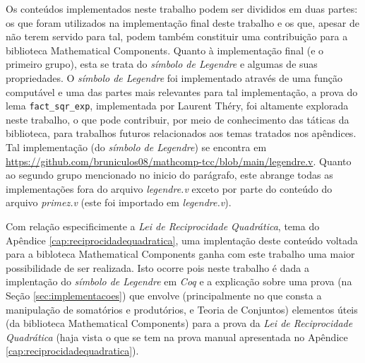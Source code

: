 Os conteúdos implementados neste trabalho podem ser divididos em duas partes: os que foram utilizados na implementação final deste trabalho e os que, apesar de não terem servido para tal, podem também constituir uma contribuição para a biblioteca Mathematical Components. 
Quanto à implementação final (e o primeiro grupo), esta se trata do \textit{símbolo de Legendre} e algumas de suas propriedades. O \textit{símbolo de Legendre} foi implementado através de uma função computável e uma das partes mais relevantes para tal implementação, a prova do lema \lstinline[language=coq]|fact_sqr_exp|, implementada por Laurent Théry, foi altamente explorada neste trabalho, o que pode contribuir, por meio de conhecimento das táticas da biblioteca, para trabalhos futuros relacionados aos temas tratados nos apêndices. Tal implementação (do \textit{símbolo de Legendre}) se encontra em \url{https://github.com/bruniculos08/mathcomp-tcc/blob/main/legendre.v}. Quanto ao segundo grupo mencionado no inicio do parágrafo, este abrange todas as implementações fora do arquivo \textit{legendre.v} exceto por parte do conteúdo do arquivo \textit{primez.v} (este foi importado em \textit{legendre.v}).

Com relação especificimente a \textit{Lei de Reciprocidade Quadrática}, tema do Apêndice \ref{cap:reciprocidadequadratica}, uma implentação deste conteúdo voltada para a bibloteca Mathematical Components ganha com este trabalho uma maior possibilidade de ser realizada. Isto ocorre pois neste trabalho é dada a implentação do \textit{símbolo de Legendre} em \textit{Coq} e a explicação sobre uma prova (na Seção \ref{sec:implementacoes}) que envolve (principalmente no que consta a manipulação de somatórios e produtórios, e Teoria de Conjuntos) elementos úteis (da biblioteca Mathematical Components) para a prova da \textit{Lei de Reciprocidade Quadrática} (haja vista o que se tem na prova manual apresentada no Apêndice \ref{cap:reciprocidadequadratica}).

